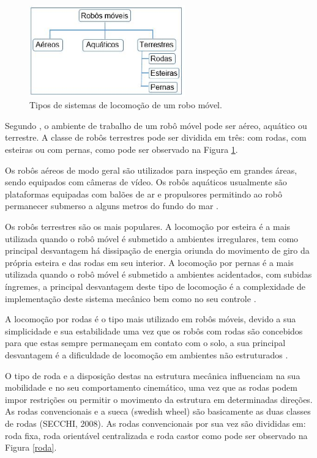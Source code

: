 \begin{figure}[H]
    \centering
    \includegraphics[width=0.6\textwidth]{figuras/locomocao.eps}
    \caption{Tipos de sistemas de locomoção de um robo móvel.}
    \label{fig:locomocao}
\end{figure}

Segundo , o ambiente de trabalho de um robô móvel pode ser aéreo, aquático ou terrestre. A classe de robôs
terrestres pode ser dividida em três: com rodas, com esteiras ou com pernas, como pode ser observado na Figura \ref{fig:locomocao}.

Os robôs aéreos de modo geral são utilizados para inspeção em grandes áreas, sendo equipados com câmeras de vídeo.  Os robôs aquáticos
usualmente são plataformas equipadas com balões de ar e propulsores permitindo ao robô permanecer submerso a alguns metros do fundo do
mar \cite{pieri:2002}.

Os robôs terrestres são os mais populares. A locomoção por esteira é a mais utilizada quando o robô móvel é submetido a ambientes
irregulares, tem como principal desvantagem há dissipação de energia oriunda do movimento de giro da própria esteira e das rodas em seu
interior. A locomoção por pernas é a mais utilizada quando o robô móvel é submetido a ambientes acidentados, com subidas íngremes, a
principal desvantagem deste tipo de locomoção é a complexidade de implementação deste sistema mecânico bem como no seu controle \cite{pieri:2002}.

A locomoção por rodas é o tipo mais utilizado em robôs móveis, devido a sua simplicidade e sua estabilidade uma vez que os robôs com
rodas são concebidos para que estas sempre permaneçam em contato com o solo, a sua principal desvantagem é a dificuldade de locomoção
em ambientes não estruturados \cite{pieri:2002} \cite{siegwart:2002}. 

O tipo de roda e a disposição destas na estrutura mecânica influenciam na sua mobilidade e no seu comportamento cinemático, uma vez
que as rodas podem impor restrições ou permitir o movimento da estrutura em determinadas direções. As rodas convencionais e a sueca
(swedish wheel) são basicamente as duas classes de rodas (SECCHI, 2008). As rodas convencionais por sua vez são divididas em: roda fixa,
roda orientável centralizada e roda castor como pode ser observado na Figura \ref{roda}.

